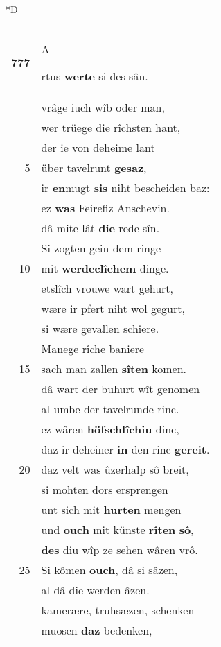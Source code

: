 \documentclass[8pt,a4paper,notitlepage]{article}
\begin{document}
\begin{table}[ht]
\begin{minipage}[t]{0.5\linewidth}
\small
\begin{center}*D
\end{center}
\begin{tabular}{rl}
\textbf{777} & \begin{large}A\end{large}rtus \textbf{werte} si des sân.\\ 
 & vrâge iuch wîb oder man,\\ 
 & wer trüege die rîchsten hant,\\ 
 & der ie von deheime lant\\ 
5 & über tavelrunt \textbf{gesaz},\\ 
 & ir \textbf{en}mugt \textbf{sis} niht bescheiden baz:\\ 
 & ez \textbf{was} Feirefiz Anschevin.\\ 
 & dâ mite lât \textbf{die} rede sîn.\\ 
 & Si zogten gein dem ringe\\ 
10 & mit \textbf{werdeclîchem} dinge.\\ 
 & etslîch vrouwe wart gehurt,\\ 
 & wære ir pfert niht wol gegurt,\\ 
 & si wære gevallen schiere.\\ 
 & Manege rîche baniere\\ 
15 & sach man zallen \textbf{sîten} komen.\\ 
 & dâ wart der buhurt wît genomen\\ 
 & al umbe der tavelrunde rinc.\\ 
 & ez wâren \textbf{höfschlîchiu} dinc,\\ 
 & daz ir deheiner \textbf{in} den rinc \textbf{gereit}.\\ 
20 & daz velt was ûzerhalp sô breit,\\ 
 & si mohten dors ersprengen\\ 
 & unt sich mit \textbf{hurten} mengen\\ 
 & und \textbf{ouch} mit künste \textbf{rîten} \textbf{sô},\\ 
 & \textbf{des} diu wîp ze sehen wâren vrô.\\ 
25 & Si kômen \textbf{ouch}, dâ si sâzen,\\ 
 & al dâ die werden âzen.\\ 
 & kamerære, truhsæzen, schenken\\ 
 & muosen \textbf{daz} bedenken,\\ 

\end{tabular}
\end{minipage}
\end{table}
\end{document}
